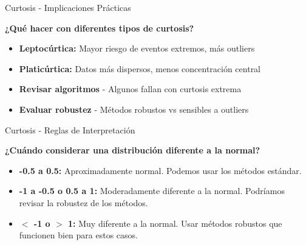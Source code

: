 \documentclass{beamer}
\begin{document}
\begin{frame}{Curtosis - Implicaciones Prácticas}
    \begin{center}
        \textbf{¿Qué hacer con diferentes tipos de curtosis?}
    \end{center}
    
    \vspace{0.5cm}
    
    \begin{itemize}
        \item<1->[{\makebox[1em][c]{\textcolor{black}{\faExclamationTriangle}}}] \textbf{Leptocúrtica:} Mayor riesgo de eventos extremos, más outliers
        \item<2->[{\makebox[1em][c]{\textcolor{black}{\faArrowsH}}}] \textbf{Platicúrtica:} Datos más dispersos, menos concentración central
        \item<3->[{\makebox[1em][c]{\textcolor{black}{\faCogs}}}] \textbf{Revisar algoritmos} - Algunos fallan con curtosis extrema
        \item<4->[{\makebox[1em][c]{\textcolor{black}{\faShield}}}] \textbf{Evaluar robustez} - Métodos robustos vs sensibles a outliers
    \end{itemize}
    
\end{frame}

\begin{frame}{Curtosis - Reglas de Interpretación}
    \begin{center}
        \textbf{¿Cuándo considerar una distribución diferente a la normal?}
    \end{center}
    
    \vspace{0.5cm}
    
    \begin{itemize}
        \item<1-> \textbf{-0.5 a 0.5:} Aproximadamente normal. Podemos usar los métodos estándar.
        \item<2-> \textbf{-1 a -0.5 o 0.5 a 1:} Moderadamente diferente a la normal. Podríamos revisar la robustez de los métodos.
        \item<3-> \textbf{$<$ -1 o $>$ 1:} Muy diferente a la normal. Usar métodos robustos que funcionen bien para estos casos.
    \end{itemize}
\end{frame}
\end{document}
